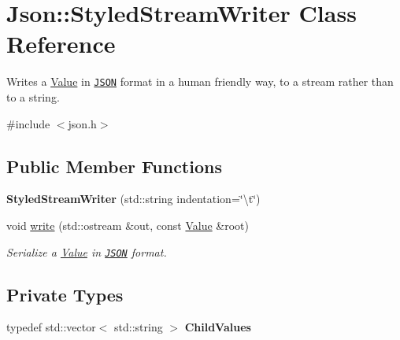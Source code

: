 \hypertarget{class_json_1_1_styled_stream_writer}{}\section{Json\+:\+:Styled\+Stream\+Writer Class Reference}
\label{class_json_1_1_styled_stream_writer}


Writes a \hyperlink{class_json_1_1_value}{Value} in \href{http://www.json.org}{\tt J\+S\+O\+N} format in a human friendly way, to a stream rather than to a string.  




{\ttfamily \#include $<$json.\+h$>$}

\subsection*{Public Member Functions}
\begin{DoxyCompactItemize}
\item 
\hypertarget{class_json_1_1_styled_stream_writer_ae87567a08de865b6dc84d7218a3001df}{}{\bfseries Styled\+Stream\+Writer} (std\+::string indentation=\char`\"{}\textbackslash{}t\char`\"{})\label{class_json_1_1_styled_stream_writer_ae87567a08de865b6dc84d7218a3001df}

\item 
void \hyperlink{class_json_1_1_styled_stream_writer_a07807741c6c43ecd35885a87234d0805}{write} (std\+::ostream \&out, const \hyperlink{class_json_1_1_value}{Value} \&root)
\begin{DoxyCompactList}\small\item\em Serialize a \hyperlink{class_json_1_1_value}{Value} in \href{http://www.json.org}{\tt J\+S\+O\+N} format. \end{DoxyCompactList}\end{DoxyCompactItemize}
\subsection*{Private Types}
\begin{DoxyCompactItemize}
\item 
\hypertarget{class_json_1_1_styled_stream_writer_ad0e42dda934aaee87fa9434c30186a9b}{}typedef std\+::vector$<$ std\+::string $>$ {\bfseries Child\+Values}\label{class_json_1_1_styled_stream_writer_ad0e42dda934aaee87fa9434c30186a9b}

\end{DoxyCompactItemize}
